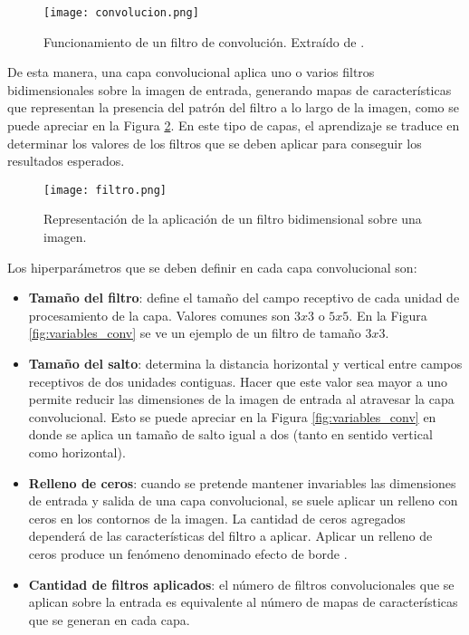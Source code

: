 \begin{figure}[H]
  \centering{}
  \texttt{[image: convolucion.png]}
  \caption{Funcionamiento de un filtro de convolución. Extraído de \cite{dragon}.}
  \label{fig:convolucion}
\end{figure}

De esta manera, una capa convolucional aplica uno o varios filtros bidimensionales sobre la imagen de entrada, generando mapas de características que representan la presencia del patrón del filtro a lo largo de la imagen, como se puede apreciar en la Figura \ref{fig:numerito}. En este tipo de capas, el aprendizaje se traduce en determinar los valores de los filtros que se deben aplicar para conseguir los resultados esperados. 

\begin{figure}[H]
  \centering{}
  \texttt{[image: filtro.png]}
  \caption{Representación de la aplicación de un filtro bidimensional sobre una imagen.}
  \label{fig:numerito}
\end{figure}

Los hiperparámetros que se deben definir en cada capa convolucional son: 

\begin{itemize}
\item\textbf{Tamaño del filtro}: define el tamaño del campo receptivo de cada unidad de procesamiento de la capa. Valores comunes son $3x3$ o $5x5$. En la Figura \ref{fig:variables_conv} se ve un ejemplo de un filtro de tamaño $3x3$.

\item\textbf{Tamaño del salto}: determina la distancia horizontal y vertical entre campos receptivos de dos unidades contiguas. Hacer que este valor sea mayor a uno permite reducir las dimensiones de la imagen de entrada al atravesar la capa convolucional. Esto se puede apreciar en la Figura \ref{fig:variables_conv} en donde se aplica un tamaño de salto igual a dos (tanto en sentido vertical como horizontal). 

\item\textbf{Relleno de ceros}: cuando se pretende mantener invariables las dimensiones de entrada y salida de una capa convolucional, se suele aplicar un relleno con ceros en los contornos de la imagen. La cantidad de ceros agregados dependerá de las características del filtro a aplicar. Aplicar un relleno de ceros produce un fenómeno denominado efecto de borde \cite{lagartija}. 

\item\textbf{Cantidad de filtros aplicados}: el número de filtros convolucionales que se aplican sobre la entrada es equivalente al número de mapas de características que se generan en cada capa. 

\end{itemize}

